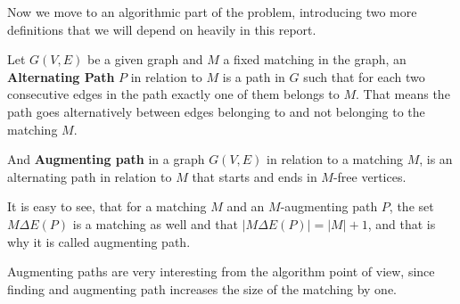 Now we move to an algorithmic part of the problem, introducing two more definitions that we will depend on heavily in this report.

\begin{definition}
	Let $G(V, E)$ be a given graph and $M$ a fixed matching in the graph, an \textbf{Alternating Path} $P$ in relation to $M$ is a path in $G$ such that for each two consecutive edges in the path exactly one of them belongs to $M$. That means  the path goes alternatively between edges belonging to and not belonging to the matching $M$.
\end{definition}

\begin{definition}
	And \textbf{Augmenting path} in a graph $G(V, E)$ in relation to a matching $M$, is an alternating path in relation to $M$ that starts and ends in $M$-free vertices.
\end{definition}
It is easy to see, that for a matching $M$ and an $M$-augmenting path $P$, the set $M \Delta E(P)$ is a matching as well and that $|M \Delta E(P)| = |M| + 1$, and that is why it is called augmenting path.

Augmenting paths are very interesting from the algorithm point of view, since finding and augmenting path increases the size of the matching by one.

